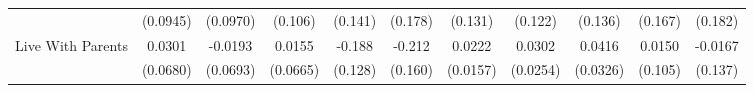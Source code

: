 {\begin{tabular}{l*{10}{c}}
            &    (0.0945)         &    (0.0970)         &     (0.106)         &     (0.141)         &     (0.178)         &     (0.131)         &     (0.122)         &     (0.136)         &     (0.167)         &     (0.182)         \\
\addlinespace
Live With Parents&      0.0301         &     -0.0193         &      0.0155         &      -0.188         &      -0.212         &      0.0222         &      0.0302         &      0.0416         &      0.0150         &     -0.0167         \\
            &    (0.0680)         &    (0.0693)         &    (0.0665)         &     (0.128)         &     (0.160)         &    (0.0157)         &    (0.0254)         &    (0.0326)         &     (0.105)         &     (0.137)         \\
\bottomrule
\end{tabular}
}
